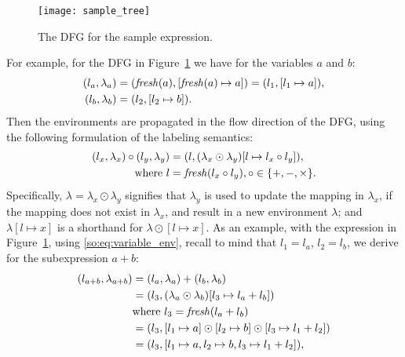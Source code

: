 \begin{figure}[ht]
    \centering
    \texttt{[image: sample\_tree]}
    \caption{The DFG for the sample expression.}\label{so:fig:sample_tree}
\end{figure}
For example, for the DFG in Figure~\ref{so:fig:sample_tree} we have for the
variables $a$ and $b$:
\begin{equation}
    \begin{aligned}
        (l_a, \lambda_a) &= (\operatorname{\mathit{fresh}}(a), [\operatorname{\mathit{fresh}}(a)\mapsto{a}])
                   = (l_1, [l_1 \mapsto a]), \\
        (l_b, \lambda_b) &= (l_2, [l_2 \mapsto b]).
    \end{aligned}
    \label{so:eq:variable_env}
\end{equation}
Then the environments are propagated in the flow direction of the DFG, using
the following formulation of the labeling semantics:
\begin{equation}
    \begin{aligned}
        (l_x, \lambda_x) \circ (l_y, \lambda_y)
            &= (l, (\lambda_x\odot\lambda_y)
                      [l\mapsto{l_x \circ l_y}]), \\
            \text{where~} l &= \operatorname{\mathit{fresh}}(l_x \circ l_y),
                          \circ\in\{+, -, \times\}.
    \end{aligned}
    \label{so:eq:labeling_semantics}
\end{equation}
Specifically, $\lambda=\lambda_x\odot\lambda_y$ signifies that $\lambda_y$
is used to update the mapping in $\lambda_x$, if the mapping does not
exist in $\lambda_x$, and result in a new environment $\lambda$; and
$\lambda[l\mapsto{x}]$ is a shorthand for $\lambda\odot[l\mapsto{x}]$.  As
an example, with the expression in Figure~\ref{so:fig:sample_tree}, using
\eqref{so:eq:variable_env}, recall to mind that $l_1 = l_a$, $l_2 = l_b$, we
derive for the subexpression $a + b$:
\begin{equation}
    \begin{aligned}
        (l_{a + b}, \lambda_{a + b})
            &= (l_a, \lambda_a) + (l_b, \lambda_b) \\
            &= (l_3, (\lambda_a \odot \lambda_b) [l_3\mapsto{l_a + l_b}]) \\
            &  \text{where~} l_3 = \operatorname{\mathit{fresh}}(l_a + l_b) \\
            &= (l_3, [l_1\mapsto{a}]\odot
                     [l_2\mapsto{b}]\odot
                     [l_3\mapsto{l_1 + l_2}]) \\
            &= (l_3, [l_1\mapsto{a}, l_2\mapsto{b}, l_3\mapsto{l_1 + l_2}]),
    \end{aligned}
\end{equation}
